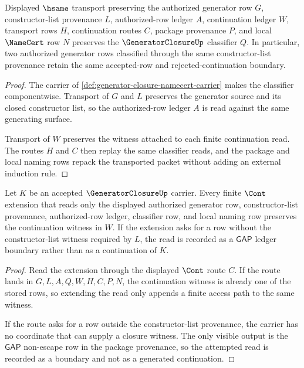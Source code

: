 \begin{theorem}
\label{thm:generator-closure-classifier-stability}
Displayed $\hsame$ transport preserving the authorized generator row $G$, constructor-list provenance $L$, authorized-row ledger $A$, continuation ledger $W$, transport rows $H$, continuation routes $C$, package provenance $P$, and local $\NameCert$ row $N$ preserves the $\GeneratorClosureUp$ classifier $Q$. In particular, two authorized generator rows classified through the same constructor-list provenance retain the same accepted-row and rejected-continuation boundary.
\end{theorem}
\begin{proof}
The carrier of \autoref{def:generator-closure-namecert-carrier} makes the classifier componentwise. Transport of $G$ and $L$ preserves the generator source and its closed constructor list, so the authorized-row ledger $A$ is read against the same generating surface.

Transport of $W$ preserves the witness attached to each finite continuation read. The routes $H$ and $C$ then replay the same classifier reads, and the package and local naming rows repack the transported packet without adding an external induction rule.
\end{proof}

\begin{theorem}
\label{thm:generator-closure-continuation-witness}
Let $K$ be an accepted $\GeneratorClosureUp$ carrier. Every finite $\Cont$ extension that reads only the displayed authorized generator row, constructor-list provenance, authorized-row ledger, classifier row, and local naming row preserves the continuation witness in $W$. If the extension asks for a row without the constructor-list witness required by $L$, the read is recorded as a $\mathsf{GAP}$ ledger boundary rather than as a continuation of $K$.
\end{theorem}
\begin{proof}
Read the extension through the displayed $\Cont$ route $C$. If the route lands in $G,L,A,Q,W,H,C,P,N$, the continuation witness is already one of the stored rows, so extending the read only appends a finite access path to the same witness.

If the route asks for a row outside the constructor-list provenance, the carrier has no coordinate that can supply a closure witness. The only visible output is the $\mathsf{GAP}$ non-escape row in the package provenance, so the attempted read is recorded as a boundary and not as a generated continuation.
\end{proof}

